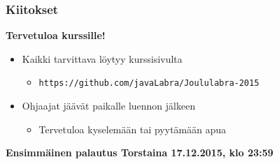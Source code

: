 \documentclass[finnish]{beamer}
\begin{document}
	\begin{frame}
		\frametitle{Kiitokset}

		{\LARGE \textbf{Tervetuloa kurssille!}}
		\begin{itemize}
			\item Kaikki tarvittava löytyy kurssisivulta
			\begin{itemize}
				\item \texttt{https://github.com/javaLabra/Joululabra-2015}
			\end{itemize}
			\item Ohjaajat jäävät paikalle luennon jälkeen
			\begin{itemize}
				\item Tervetuloa kyselemään tai pyytämään apua 
			\end{itemize}
		\end{itemize}
		\textbf{Ensimmäinen palautus Torstaina 17.12.2015, klo 23:59}
		
	\end{frame}
	
\end{document}
